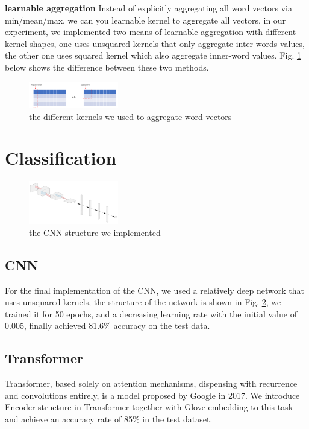 \documentclass[journal]{IEEEtran}
\begin{document}
\textbf{learnable aggregation} Instead of explicitly aggregating all word vectors via min/mean/max, we can you learnable kernel to aggregate all vectors, in our experiment, we implemented two means of learnable aggregation with different kernel shapes, one uses unsquared kernels that only aggregate inter-words values, the other one uses squared kernel which also aggregate inner-word values. Fig. \ref{different_kernel} below shows the difference between these two methods.

\begin{figure}[h]
    \centering
        \includegraphics[width=0.35\textwidth]{different_kernel.png}
    \caption{\label{different_kernel}the different kernels we used to aggregate word vectors}
\end{figure}


\section{Classification}

\begin{figure}[h]
    \centering
        \includegraphics[width=0.35\textwidth]{cnn.png}
    \caption{\label{cnn}the CNN structure we implemented}
\end{figure}

\subsection{CNN}
For the final implementation of the CNN, we used a  relatively deep network that uses unsquared kernels, the structure of the network is shown in Fig. \ref{cnn}, we trained it for 50 epochs, and a decreasing learning rate with the initial value of 0.005, finally achieved 81.6\% accuracy on the test data.

\subsection{Transformer}
Transformer, based solely on attention mechanisms, dispensing with recurrence and convolutions entirely, is a model proposed by Google in 2017.\cite{transformer} We introduce Encoder structure in Transformer together with Glove embedding to this task and achieve an accuracy rate of 85\% in the test dataset.
\end{document}
